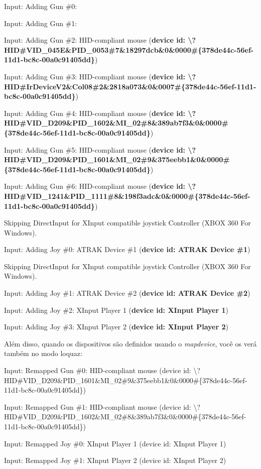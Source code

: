 \documentclass[letterpaper,10pt,brazil]{sphinxmanual}
\begin{document}
\begin{DUlineblock}{0em}
\item[] Input: Adding Gun \#0:
\item[] Input: Adding Gun \#1:
\item[] Input: Adding Gun \#2: HID-compliant mouse (\textbf{device id: \textbackslash{}?HID\#VID\_045E\&PID\_0053\#7\&18297dcb\&0\&0000\#\{378de44c-56ef-11d1-bc8c-00a0c91405dd\}})
\item[] Input: Adding Gun \#3: HID-compliant mouse (\textbf{device id: \textbackslash{}?HID\#IrDeviceV2\&Col08\#2\&2818a073\&0\&0007\#\{378de44c-56ef-11d1-bc8c-00a0c91405dd\}})
\item[] Input: Adding Gun \#4: HID-compliant mouse (\textbf{device id: \textbackslash{}?HID\#VID\_D209\&PID\_1602\&MI\_02\#8\&389ab7f3\&0\&0000\#\{378de44c-56ef-11d1-bc8c-00a0c91405dd\}})
\item[] Input: Adding Gun \#5: HID-compliant mouse (\textbf{device id: \textbackslash{}?HID\#VID\_D209\&PID\_1601\&MI\_02\#9\&375eebb1\&0\&0000\#\{378de44c-56ef-11d1-bc8c-00a0c91405dd\}})
\item[] Input: Adding Gun \#6: HID-compliant mouse (\textbf{device id: \textbackslash{}?HID\#VID\_1241\&PID\_1111\#8\&198f3adc\&0\&0000\#\{378de44c-56ef-11d1-bc8c-00a0c91405dd\}})
\item[] Skipping DirectInput for XInput compatible joystick Controller (XBOX 360 For Windows).
\item[] Input: Adding Joy \#0: ATRAK Device \#1 (\textbf{device id: ATRAK Device \#1})
\item[] Skipping DirectInput for XInput compatible joystick Controller (XBOX 360 For Windows).
\item[] Input: Adding Joy \#1: ATRAK Device \#2 (\textbf{device id: ATRAK Device \#2})
\item[] Input: Adding Joy \#2: XInput Player 1 (\textbf{device id: XInput Player 1})
\item[] Input: Adding Joy \#3: XInput Player 2 (\textbf{device id: XInput Player 2})
\item[] 
\end{DUlineblock}

Além disso, quando os dispositivos são definidos usando o \emph{mapdevice},
você os verá também no modo loquaz:

\begin{DUlineblock}{0em}
\item[] Input: Remapped Gun \#0: HID-compliant mouse (device id: \textbackslash{}?HID\#VID\_D209\&PID\_1601\&MI\_02\#9\&375eebb1\&0\&0000\#\{378de44c-56ef-11d1-bc8c-00a0c91405dd\})
\item[] Input: Remapped Gun \#1: HID-compliant mouse (device id: \textbackslash{}?HID\#VID\_D209\&PID\_1602\&MI\_02\#8\&389ab7f3\&0\&0000\#\{378de44c-56ef-11d1-bc8c-00a0c91405dd\})
\item[] Input: Remapped Joy \#0: XInput Player 1 (device id: XInput Player 1)
\item[] Input: Remapped Joy \#1: XInput Player 2 (device id: XInput Player 2)
\item[] 
\end{DUlineblock}
\end{document}
